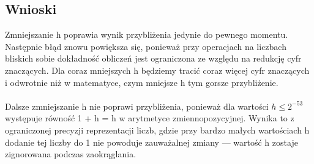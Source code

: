 \documentclass{article}
\begin{document}
\subsection{Wnioski}
Zmniejszanie h poprawia wynik przybliżenia jedynie do pewnego momentu. Następnie błąd znowu powiększa się, ponieważ przy operacjach na liczbach bliskich sobie dokładność obliczeń jest ograniczona ze względu na redukcję cyfr znaczących. Dla coraz mniejszych h będziemy tracić coraz więcej cyfr znaczących i odwrotnie niż w matematyce, czym mniejsze h tym gorsze przybliżenie.
\\
\\ Dalsze zmniejszanie h nie poprawi przybliżenia, ponieważ dla wartości $h \leq 2^{-53}$ występuje równość 1 + h = h w arytmetyce zmiennopozycyjnej. Wynika to z ograniczonej precyzji reprezentacji liczb, gdzie przy bardzo małych wartościach h dodanie tej liczby do 1 nie powoduje zauważalnej zmiany — wartość h zostaje zignorowana podczas zaokrąglania.
\end{document}
